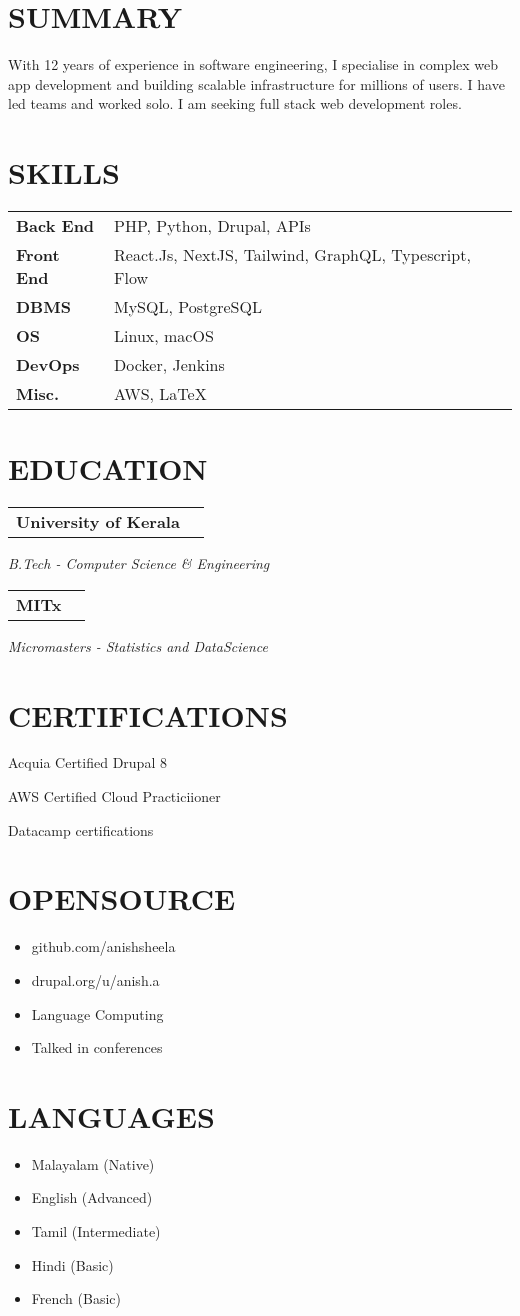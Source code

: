 \documentclass[11pt,a4paper]{moderncv}
\newcommand*{\educationentry}[4][0.5mm]{
    \begin{tabularx}{\textwidth}{LR}
        {\bfseries #3}\\
    \end{tabularx}
    {\itshape #2}
    \par\addvspace{#1}
}
\newcommand*{\scoreentry}[1][2.5mm]{
    \par\addvspace{#1}
}
\begin{document}
\begin{minipage}[t]{0.35\textwidth}
\section{SUMMARY}
With 12 years of experience in software engineering, I specialise in complex web app development and building scalable infrastructure for millions of users. I have led teams and worked solo. I am seeking full stack web development roles.

\section{SKILLS}
\begin{tabularx}{\textwidth}{>{\bfseries}l@{\hskip 3.5mm}L}
Back End & PHP, Python, Drupal, APIs \\
Front End & React.Js, NextJS, Tailwind, GraphQL, Typescript, Flow \\
DBMS & MySQL, PostgreSQL \\
OS & Linux, macOS \\
DevOps & Docker, Jenkins \\
Misc. & AWS, \LaTeX 
\end{tabularx}

\section{EDUCATION}
\educationentry{B.Tech - Computer Science \& Engineering}{University of Kerala}{}

\vspace{2.0mm}
\educationentry{Micromasters - Statistics and DataScience}{MITx}{}

\section{CERTIFICATIONS}
\scoreentry{Acquia Certified Drupal 8}{}
\scoreentry{AWS Certified Cloud Practiciioner}{}
\scoreentry{Datacamp certifications}{}

\section{OPENSOURCE}
\begin{itemize}
    \item github.com/anishsheela
    \item drupal.org/u/anish.a
    \item Language Computing
    \item Talked in conferences
\end{itemize}

\section{LANGUAGES}
\begin{itemize}
    \item Malayalam (Native)
    \item English (Advanced)
    \item Tamil (Intermediate)
    \item Hindi (Basic)
    \item French (Basic)
\end{itemize}
\end{minipage}
\end{document}
